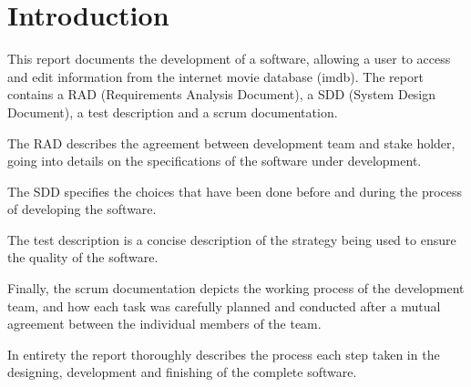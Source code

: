 \chapter{Introduction}
This report documents the development of a software, allowing a user to access and edit information from the internet movie database (imdb).
The report contains a RAD (Requirements Analysis Document), a SDD (System Design Document), a test description and a scrum documentation.

The RAD describes the agreement between development team and stake holder, going into details on the specifications of the software under development.

The SDD specifies the choices that have been done before and during the process of developing the software.

The test description is a concise description of the strategy being used to ensure the quality of the software.

Finally, the scrum documentation depicts the working process of the development team, and how each task was carefully planned and conducted after a mutual agreement between the individual members of the team.

In entirety the report thoroughly describes the process each step taken in the designing, development and finishing of the complete software.

